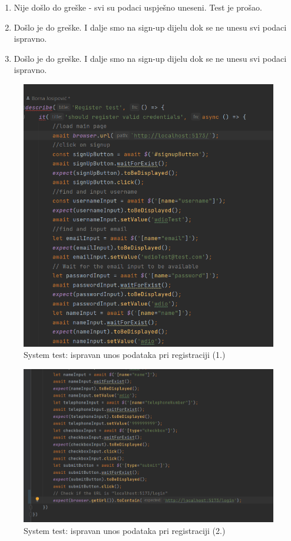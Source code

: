 				\begin{enumerate}
					\item Nije došlo do greške - svi su podaci uspješno uneseni. Test je prošao.
					\item Došlo je do greške. I dalje smo na sign-up dijelu dok se ne unesu svi podaci ispravno.
					\item Došlo je do greške. I dalje smo na sign-up dijelu dok se ne unesu svi podaci ispravno.
				\end{enumerate}
			
			\begin{figure}[H]
				\includegraphics[scale=0.7]{slike/sysreg1.PNG} 
				\centering
				\caption{System test: ispravan unos podataka pri registraciji (1.)}
				\label{sysreg1}
			\end{figure}
			
			\begin{figure}[H]
				\includegraphics[scale=0.7]{slike/sysreg2.PNG} 
				\centering
				\caption{System test: ispravan unos podataka pri registraciji (2.)}
				\label{sysreg2}
			\end{figure}
			
